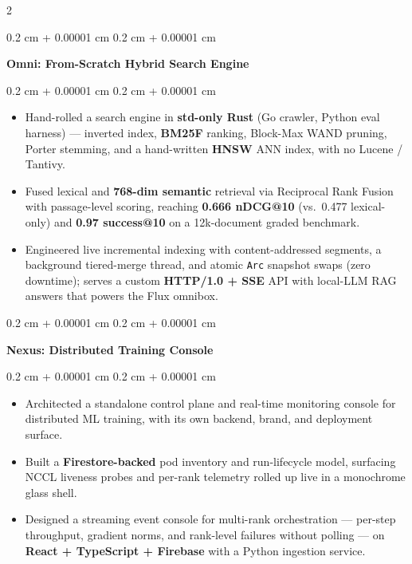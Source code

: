 \documentclass[10pt, letterpaper]{article}
\newenvironment{highlights}{
    \begin{itemize}[
        topsep=0.03 cm,
        parsep=0.03 cm,
        partopsep=0pt,
        itemsep=0pt,
        leftmargin=0.4 cm + 10pt
    ]
}{
    \end{itemize}
} %
\newenvironment{onecolentry}{
    \begin{adjustwidth}{
        0.2 cm + 0.00001 cm
    }{
        0.2 cm + 0.00001 cm
    }
}{
    \end{adjustwidth}
} %
\newenvironment{twocolentry}[2][]{
    \onecolentry
    \def\secondColumn{#2}
}{
    \hfill \secondColumn
    \endonecolentry
} %
\let\hrefWithoutArrow\href
\renewcommand{\href}[2]{\hrefWithoutArrow{#1}{\ifthenelse{\equal{#2}{}}{ }{#2 }\raisebox{.15ex}{\footnotesize \faExternalLink*}}}
\begin{document}
\begin{paracol}{2}
    \begin{twocolentry}{
        \href{https://github.com/razeenwasif/omni}{Github}
    }
        \textbf{Omni: From-Scratch Hybrid Search Engine}
    \end{twocolentry}

    \vspace{0.05 cm}
    \begin{onecolentry}
        \begin{highlights}
            \item Hand-rolled a search engine in \textbf{std-only Rust} (Go crawler, Python eval harness) — inverted index, \textbf{BM25F} ranking, Block-Max WAND pruning, Porter stemming, and a hand-written \textbf{HNSW} ANN index, with no Lucene / Tantivy.
            \item Fused lexical and \textbf{768-dim semantic} retrieval via Reciprocal Rank Fusion with passage-level scoring, reaching \textbf{0.666 nDCG@10} (vs.~0.477 lexical-only) and \textbf{0.97 success@10} on a 12k-document graded benchmark.
            \item Engineered live incremental indexing with content-addressed segments, a background tiered-merge thread, and atomic \texttt{Arc} snapshot swaps (zero downtime); serves a custom \textbf{HTTP/1.0 + SSE} API with local-LLM RAG answers that powers the Flux omnibox.
        \end{highlights}
    \end{onecolentry}

    \begin{twocolentry}{
        \href{https://nexus-cluster.web.app}{Live}
    }
        \textbf{Nexus: Distributed Training Console}
    \end{twocolentry}

    \vspace{0.05 cm}
    \begin{onecolentry}
        \begin{highlights}
            \item Architected a standalone control plane and real-time monitoring console for distributed ML training, with its own backend, brand, and deployment surface.
            \item Built a \textbf{Firestore-backed} pod inventory and run-lifecycle model, surfacing NCCL liveness probes and per-rank telemetry rolled up live in a monochrome glass shell.
            \item Designed a streaming event console for multi-rank orchestration — per-step throughput, gradient norms, and rank-level failures without polling — on \textbf{React + TypeScript + Firebase} with a Python ingestion service.
        \end{highlights}
    \end{onecolentry}


\end{paracol}
\end{document}
